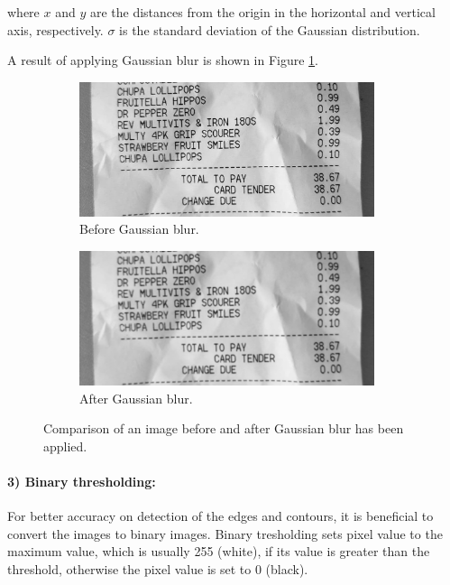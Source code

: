 \documentclass[
  digital, %
  table,   %
  oneside, %
  lof,     %
  lot,     %
]{fithesis3}
\begin{document}
where $x$ and $y$ are the distances from the origin in the horizontal and vertical axis, respectively. $\sigma$ is the standard deviation of the Gaussian distribution. \cite{OCRCNN}

A result of applying Gaussian blur is shown in Figure \ref{fig:gaussian_blur}.

\begin{figure}
    \centering
    \begin{subfigure}[t]{0.5\textwidth}
      \centering
      \includegraphics[width=0.95\textwidth]{figures/image_processing/before_blur}
      \caption{Before Gaussian blur.}
    \end{subfigure}
    \begin{subfigure}[t]{0.5\textwidth}
      \centering
      \includegraphics[width=0.95\textwidth]{figures/image_processing/after_blur}
      \caption{After Gaussian blur.}
    \end{subfigure}
    \caption{Comparison of an image before and after Gaussian blur has been applied.}
    \label{fig:gaussian_blur}
\end{figure}

\paragraph{3) Binary thresholding:} For better accuracy on detection of the edges and contours, it is beneficial to convert the images to binary images. Binary tresholding sets pixel value to the maximum value, which is usually 255 (white), if its value is greater than the threshold, otherwise the pixel value is set to 0 (black).
\end{document}
